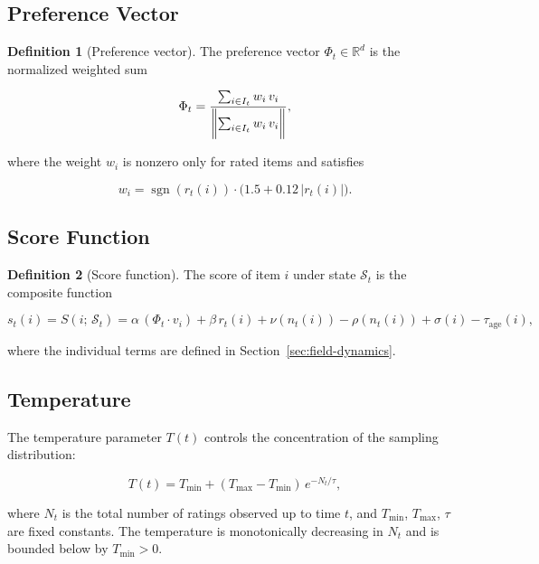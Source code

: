 \documentclass[12pt, a4paper]{article}
\DeclarePairedDelimiter{\norm}{\lVert}{\rVert}
\theoremstyle{definition}
\newtheorem{defn}{Definition}[section]
\begin{document}
\subsection{Preference Vector}

\begin{defn}[Preference vector]
The preference vector $\Phi_t \in \mathbb{R}^d$ is the normalized weighted sum

\begin{equation}
\Phi_t = \frac{\sum_{i \in I_t} w_i\, v_i}{\norm[\bigg]{\sum_{i \in I_t} w_i\, v_i}},
\end{equation}

where the weight $w_i$ is nonzero only for rated items and satisfies

\begin{equation}
w_i = \operatorname{sgn}(r_t(i))\cdot\bigl(1.5 + 0.12\,|r_t(i)|\bigr).
\end{equation}
\end{defn}

\subsection{Score Function}

\begin{defn}[Score function]
The score of item $i$ under state $\mathcal{S}_t$ is the composite function

\begin{equation}
s_t(i) = S(i;\, \mathcal{S}_t) = \alpha\,(\Phi_t \cdot v_i) + \beta\, r_t(i) + \nu(n_t(i)) - \rho(n_t(i)) + \sigma(i) - \tau_{\mathrm{age}}(i),
\end{equation}

where the individual terms are defined in Section~\ref{sec:field-dynamics}.
\end{defn}

\subsection{Temperature}

The temperature parameter $T(t)$ controls the concentration of the sampling distribution:

\begin{equation}
T(t) = T_{\min} + (T_{\max} - T_{\min})\,e^{-N_t/\tau},
\end{equation}

where $N_t$ is the total number of ratings observed up to time $t$, and $T_{\min}$, $T_{\max}$, $\tau$ are fixed constants. The temperature is monotonically decreasing in $N_t$ and is bounded below by $T_{\min} > 0$.
\end{document}
